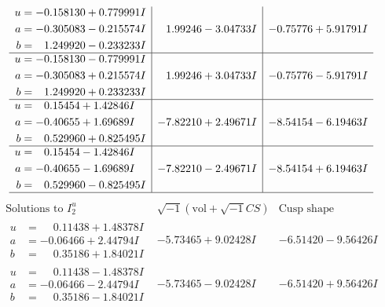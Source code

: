 \documentclass[1p]{elsarticle_modified}
\theoremstyle{definition}
\newcommand{\I}{\sqrt{-1}}
\begin{document}
$$\begin{array}{c|c|c}
\begin{aligned}
u &= -0.158130 + 0.779991 I \\
a &= -0.305083 - 0.215574 I \\
b &= \phantom{-}1.249920 - 0.233233 I\end{aligned}
 & \phantom{-}1.99246 - 3.04733 I & -0.75776 + 5.91791 I \\ \hline\begin{aligned}
u &= -0.158130 - 0.779991 I \\
a &= -0.305083 + 0.215574 I \\
b &= \phantom{-}1.249920 + 0.233233 I\end{aligned}
 & \phantom{-}1.99246 + 3.04733 I & -0.75776 - 5.91791 I \\ \hline\begin{aligned}
u &= \phantom{-}0.15454 + 1.42846 I \\
a &= -0.40655 + 1.69689 I \\
b &= \phantom{-}0.529960 + 0.825495 I\end{aligned}
 & -7.82210 + 2.49671 I & -8.54154 - 6.19463 I \\ \hline\begin{aligned}
u &= \phantom{-}0.15454 - 1.42846 I \\
a &= -0.40655 - 1.69689 I \\
b &= \phantom{-}0.529960 - 0.825495 I\end{aligned}
 & -7.82210 - 2.49671 I & -8.54154 + 6.19463 I\\
 \hline 
 \end{array}$$\newpage$$\begin{array}{c|c|c}  
\text{Solutions to }I^u_{2}& \I (\text{vol} + \sqrt{-1}CS) & \text{Cusp shape}\\
 \hline 
\begin{aligned}
u &= \phantom{-}0.11438 + 1.48378 I \\
a &= -0.06466 + 2.44794 I \\
b &= \phantom{-}0.35186 + 1.84021 I\end{aligned}
 & -5.73465 + 9.02428 I & -6.51420 - 9.56426 I \\ \hline\begin{aligned}
u &= \phantom{-}0.11438 - 1.48378 I \\
a &= -0.06466 - 2.44794 I \\
b &= \phantom{-}0.35186 - 1.84021 I\end{aligned}
 & -5.73465 - 9.02428 I & -6.51420 + 9.56426 I \\ \hline\begin{aligned}

\end{aligned}
\end{array}$$
\end{document}
